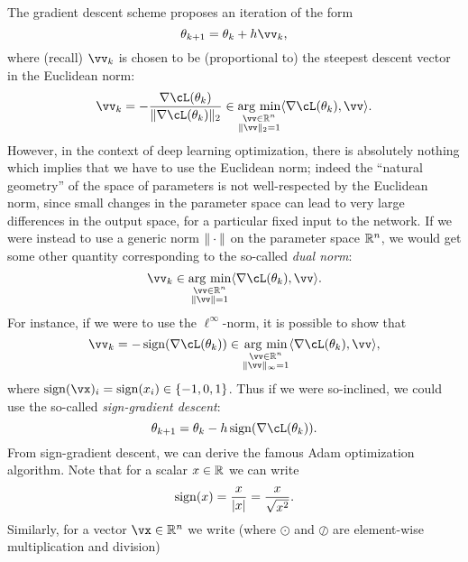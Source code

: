 \documentclass[../../book-main.tex]{subfiles}
\begin{document}
The gradient descent scheme proposes an iteration of the form 
\begin{equation}
    \theta_{k + 1} = \theta_{k} + h\vv_{k},
\end{equation}
where (recall) \(\vv_{k}\) is chosen to be (proportional to) the steepest descent vector in the Euclidean norm:
\begin{equation}
    \vv_{k} = -\frac{\nabla \cL(\theta_{k})}{\norm{\nabla \cL(\theta_{k})}_{2}} \in \argmin_{\substack{\vv \in \R^{n} \\ \norm{\vv}_{2} = 1}}\ip{\nabla \cL(\theta_{k})}{\vv}.
\end{equation}
However, in the context of deep learning optimization, there is absolutely nothing which implies that we have to use the Euclidean norm; indeed the ``natural geometry'' of the space of parameters is not well-respected by the Euclidean norm, since small changes in the parameter space can lead to very large differences in the output space, for a particular fixed input to the network. If we were instead to use a generic norm \(\norm{\cdot}\) on the parameter space \(\mathbb{R}^{n}\), we would get some other quantity corresponding to the so-called \textit{dual norm}:
\begin{equation}
    \vv_{k} \in \argmin_{\substack{\vv \in \R^{n} \\ \norm{\vv} = 1}}\ip{\nabla \cL(\theta_{k})}{\vv}.
\end{equation}
For instance, if we were to use the \(\ell^{\infty}\)-norm, it is possible to show that 
\begin{equation}
    \vv_{k} = -\sign(\nabla \cL(\theta_{k})) \in \argmin_{\substack{\vv \in \R^{n} \\ \norm{\vv}_{\infty} = 1}}\ip{\nabla \cL(\theta_{k})}{\vv},
\end{equation}
where \(\sign(\vx)_{i} = \sign(x_{i}) \in \{-1, 0, 1\}\). Thus if we were so-inclined, we could use the so-called \textit{sign-gradient descent}:
\begin{equation}\label{eq:sign_gradient_descent}
    \theta_{k + 1} = \theta_{k} - h\sign(\nabla \cL(\theta_{k})).
\end{equation}
From sign-gradient descent, we can derive the famous Adam optimization algorithm. Note that for a scalar \(x \in \mathbb{R}\) we can write
\begin{equation}
    \sign(x) = \frac{x}{\abs{x}} = \frac{x}{\sqrt{x^{2}}}.
\end{equation}
Similarly, for a vector \(\vx \in \R^{n}\) we write (where \(\odot\) and \(\oslash\) are element-wise multiplication and division)
\end{document}
